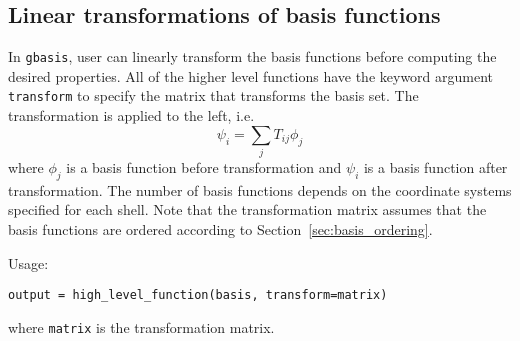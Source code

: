 \documentclass[letterpaper]{article}
\begin{document}
\subsection{Linear transformations of basis functions}
In \verb|gbasis|, user can linearly transform the basis functions before
computing the desired properties.
All of the higher level functions have the keyword argument \verb|transform| to
specify the matrix that transforms the basis set.
The transformation is applied to the left, i.e.
\begin{equation}
 \psi_i = \sum_j T_{ij} \phi_j
\end{equation}
where $\phi_j$ is a basis function before transformation and $\psi_i$ is a
basis function after transformation.
The number of basis functions depends on the coordinate systems specified for
each shell.
Note that the transformation matrix assumes that the basis functions are ordered
according to Section~\ref{sec:basis_ordering}.

Usage:
\begin{verbatim}
output = high_level_function(basis, transform=matrix)
\end{verbatim}
where \verb|matrix| is the transformation matrix.
\end{document}
